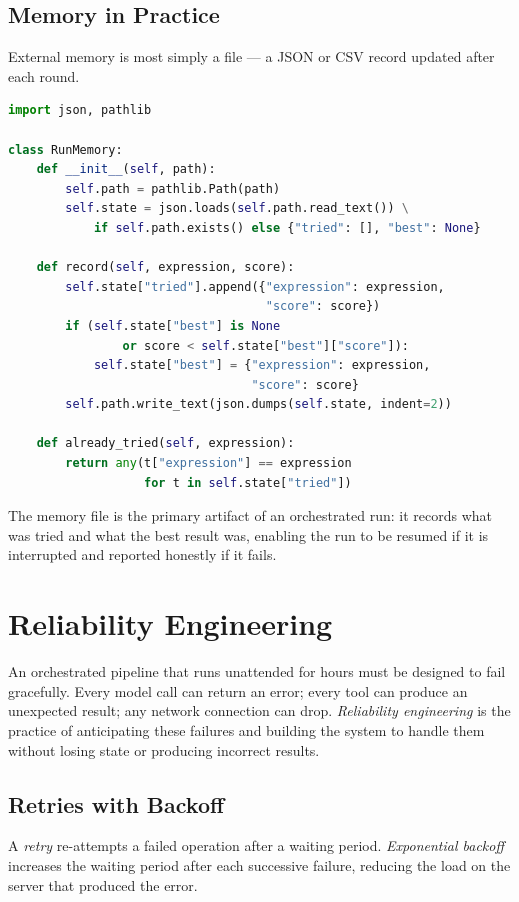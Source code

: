 \subsection{Memory in Practice}

External memory is most simply a file — a JSON or CSV record updated after each round.

\begin{lstlisting}[language=python]
import json, pathlib

class RunMemory:
    def __init__(self, path):
        self.path = pathlib.Path(path)
        self.state = json.loads(self.path.read_text()) \
            if self.path.exists() else {"tried": [], "best": None}

    def record(self, expression, score):
        self.state["tried"].append({"expression": expression,
                                    "score": score})
        if (self.state["best"] is None
                or score < self.state["best"]["score"]):
            self.state["best"] = {"expression": expression,
                                  "score": score}
        self.path.write_text(json.dumps(self.state, indent=2))

    def already_tried(self, expression):
        return any(t["expression"] == expression
                   for t in self.state["tried"])
\end{lstlisting}
The memory file is the primary artifact of an orchestrated run: it records what was tried and what the best result was, enabling the run to be resumed if it is interrupted and reported honestly if it fails.

\section{Reliability Engineering}
\label{section:Reliability}

An orchestrated pipeline that runs unattended for hours must be designed to fail gracefully.
Every model call can return an error; every tool can produce an unexpected result; any network connection can drop.
\emph{Reliability engineering}\index{Reliability} is the practice of anticipating these failures and building the system to handle them without losing state or producing incorrect results.

\subsection{Retries with Backoff}

A \emph{retry} re-attempts a failed operation after a waiting period.
\emph{Exponential backoff}\index{Exponential backoff} increases the waiting period after each successive failure, reducing the load on the server that produced the error.

